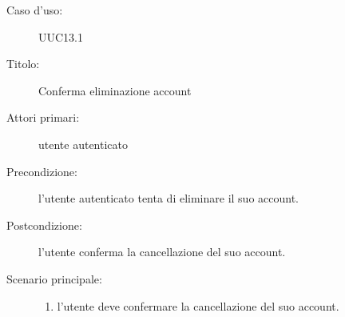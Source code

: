 \documentclass[../../../analisi-dei-requisiti.tex]{subfiles}
\begin{document}
\begin{description}
  \item[Caso d’uso:] UUC13.1
  \item[Titolo:] Conferma eliminazione account
  \item[Attori primari:] utente autenticato
  \item[Precondizione:] l'utente autenticato tenta di eliminare il suo account.
  \item[Postcondizione:] l'utente conferma la cancellazione del suo account.
  \item[Scenario principale:]
        \begin{enumerate}
          \item l'utente deve confermare la cancellazione del suo account.
        \end{enumerate}
\end{description}
\end{document}
